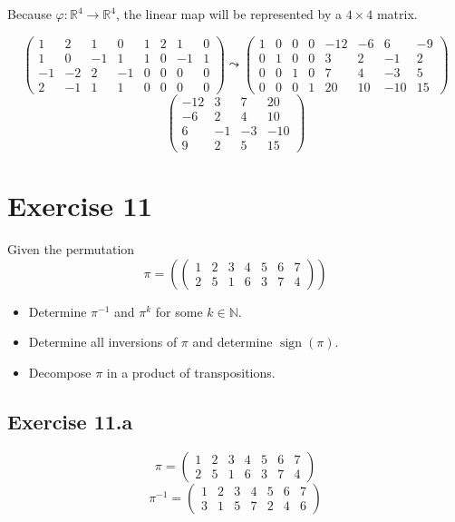 \documentclass[a4paper]{article}
\theoremstyle{definition}
\DeclareMathOperator\sign{sign}
\begin{document}
Because $\varphi: \mathbb R^4 \to \mathbb R^4$, the linear map will be represented by a $4 \times 4$ matrix.

\[
  \begin{pmatrix}
    1 & 2 & 1 & 0 & 1 & 2 & 1 & 0 \\
    1 & 0 & -1 & 1 & 1 & 0 & -1 & 1 \\
    -1 & -2 & 2 & -1 & 0 & 0 & 0 & 0 \\
    2 & -1 & 1 & 1 & 0 & 0 & 0 & 0
  \end{pmatrix}
  \leadsto
  \begin{pmatrix}
    1 & 0 & 0 & 0 & -12 & -6 & 6 & -9 \\
    0 & 1 & 0 & 0 & 3 & 2 & -1 & 2 \\
    0 & 0 & 1 & 0 & 7 & 4 & -3 & 5 \\
    0 & 0 & 0 & 1 & 20 & 10 & -10 & 15
  \end{pmatrix}
\] \[
  \begin{pmatrix}
    -12 & 3 & 7 & 20 \\
    -6 & 2 & 4 & 10 \\
    6 & -1 & -3 & -10 \\
    9 & 2 & 5 & 15
  \end{pmatrix}
\]

\section{Exercise 11}
\begin{ex}
  Given the permutation
  \[ \pi = \left(\begin{pmatrix} 1 & 2 & 3 & 4 & 5 & 6 & 7 \\ 2 & 5 & 1 & 6 & 3 & 7 & 4 \end{pmatrix}\right) \]
  \begin{itemize}
    \item Determine $\pi^{-1}$ and $\pi^k$ for some $k \in \mathbb N$.
    \item Determine all inversions of $\pi$ and determine $\sign(\pi)$.
    \item Decompose $\pi$ in a product of transpositions.
  \end{itemize}
\end{ex}

\subsection{Exercise 11.a}

\[ \pi = \begin{pmatrix} 1 & 2 & 3 & 4 & 5 & 6 & 7 \\ 2 & 5 & 1 & 6 & 3 & 7 & 4 \end{pmatrix} \]
\[ \pi^{-1} = \begin{pmatrix} 1 & 2 & 3 & 4 & 5 & 6 & 7 \\ 3 & 1 & 5 & 7 & 2 & 4 & 6 \end{pmatrix} \]
\end{document}
